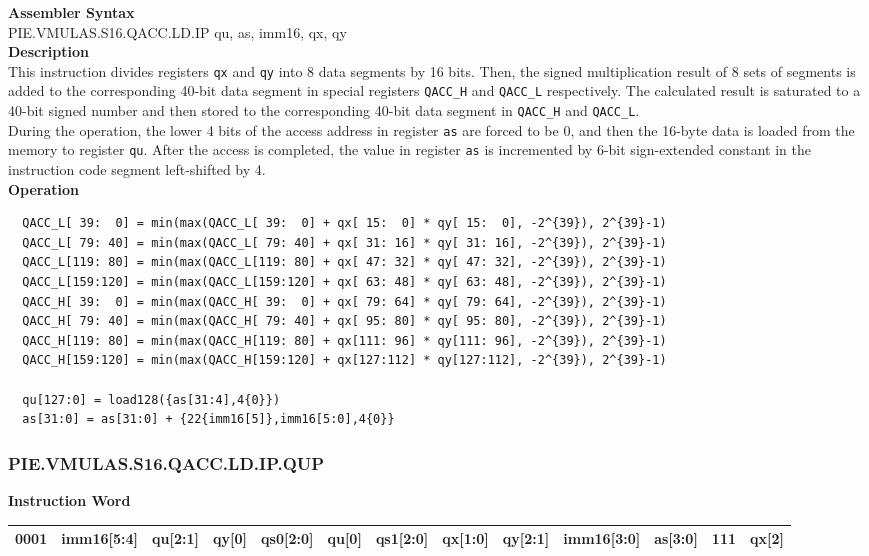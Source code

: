 \textbf{Assembler Syntax} \\
PIE.VMULAS.S16.QACC.LD.IP qu, as, imm16, qx, qy \\
\textbf{Description} \\
This instruction divides registers \lstinline{qx} and \lstinline{qy} into 8 data segments by 16 bits. Then, the signed multiplication result of 8 sets of segments is added to the corresponding 40-bit data segment in special registers \lstinline{QACC_H} and \lstinline{QACC_L} respectively. The calculated result is saturated to a 40-bit signed number and then stored to the corresponding 40-bit data segment in \lstinline{QACC_H} and \lstinline{QACC_L}.\\
During the operation, the lower 4 bits of the access address in register \lstinline{as} are forced to be 0, and then the 16-byte data is loaded from the memory to register \lstinline{qu}. After the access is completed, the value in register \lstinline{as} is incremented by 6-bit sign-extended constant in the instruction code segment left-shifted by 4.\\
\textbf{Operation}
\begin{lstlisting}
  QACC_L[ 39:  0] = min(max(QACC_L[ 39:  0] + qx[ 15:  0] * qy[ 15:  0], -2^{39}), 2^{39}-1)
  QACC_L[ 79: 40] = min(max(QACC_L[ 79: 40] + qx[ 31: 16] * qy[ 31: 16], -2^{39}), 2^{39}-1)
  QACC_L[119: 80] = min(max(QACC_L[119: 80] + qx[ 47: 32] * qy[ 47: 32], -2^{39}), 2^{39}-1)
  QACC_L[159:120] = min(max(QACC_L[159:120] + qx[ 63: 48] * qy[ 63: 48], -2^{39}), 2^{39}-1)
  QACC_H[ 39:  0] = min(max(QACC_H[ 39:  0] + qx[ 79: 64] * qy[ 79: 64], -2^{39}), 2^{39}-1)
  QACC_H[ 79: 40] = min(max(QACC_H[ 79: 40] + qx[ 95: 80] * qy[ 95: 80], -2^{39}), 2^{39}-1)
  QACC_H[119: 80] = min(max(QACC_H[119: 80] + qx[111: 96] * qy[111: 96], -2^{39}), 2^{39}-1)
  QACC_H[159:120] = min(max(QACC_H[159:120] + qx[127:112] * qy[127:112], -2^{39}), 2^{39}-1)

  qu[127:0] = load128({as[31:4],4{0}})
  as[31:0] = as[31:0] + {22{imm16[5]},imm16[5:0],4{0}}
\end{lstlisting}

\newpage
\subsubsection{PIE.VMULAS.S16.QACC.LD.IP.QUP}\label{instruction:PIEVMULASS16QACCLDIPQUP}
\setlength\tabcolsep{5pt}
\textbf{Instruction Word} \\
\begin{tabular}{|c|c|c|c|c|c|c|c|c|c|c|c|c|}
	\hline
	0001 & imm16[5:4] & qu[2:1] & qy[0] & qs0[2:0] & qu[0] & qs1[2:0] & qx[1:0] & qy[2:1] & imm16[3:0] & as[3:0] & 111 & qx[2] \\
	\hline
\end{tabular}

